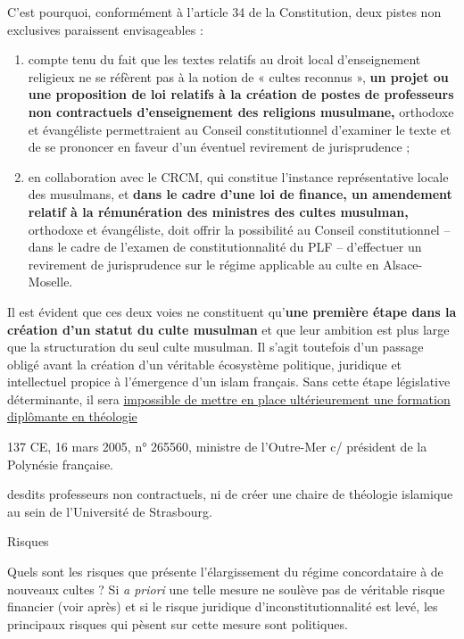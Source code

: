 C'est pourquoi, conformément à l'article 34 de la Constitution, deux
pistes non exclusives paraissent envisageables :


\begin{enumerate}
\def\labelenumi{\alph{enumi}.}
\item
  compte tenu du fait que les textes relatifs au droit local
  d'enseignement religieux ne se réfèrent pas à la notion de « cultes
  reconnus », \textbf{un projet ou une proposition de loi relatifs à la
  création de postes de professeurs non contractuels d'enseignement des
  religions musulmane,} orthodoxe et évangéliste permettraient au
  Conseil constitutionnel d'examiner le texte et de se prononcer en
  faveur d'un éventuel revirement de jurisprudence ;
\item
  
  en collaboration avec le CRCM, qui constitue l'instance représentative
  locale des musulmans, et \textbf{dans le cadre d'une loi de finance,
  un amendement relatif à la rémunération des ministres des cultes
  musulman,} orthodoxe et évangéliste, doit offrir la possibilité au
  Conseil constitutionnel -- dans le cadre de l'examen de
  constitutionnalité du PLF -- d'effectuer un revirement de
  jurisprudence sur le régime applicable au culte en Alsace-Moselle.
  
\end{enumerate}


Il est évident que ces deux voies ne constituent qu'\textbf{une première
étape dans la création d'un statut du culte musulman} et que leur
ambition est plus large que la structuration du seul culte musulman. Il
s'agit toutefois d'un passage obligé avant la création d'un véritable
écosystème politique, juridique et intellectuel propice à l'émergence
d'un islam français. Sans cette étape législative déterminante, il sera
\underline{impossible de mettre en place ultérieurement une formation
diplômante en théologie}

137 CE, 16 mars 2005, n° 265560, ministre de l'Outre-Mer c/ président de
la Polynésie française.



desdits professeurs non contractuels, ni de créer une chaire de
théologie islamique au sein de l'Université de Strasbourg.


Risques


Quels sont les risques que présente l'élargissement du régime
concordataire à de nouveaux cultes ? Si \emph{a priori} une telle mesure
ne soulève pas de véritable risque financier (voir après) et si le
risque juridique d'inconstitutionnalité est levé, les principaux risques
qui pèsent sur cette mesure sont politiques.


